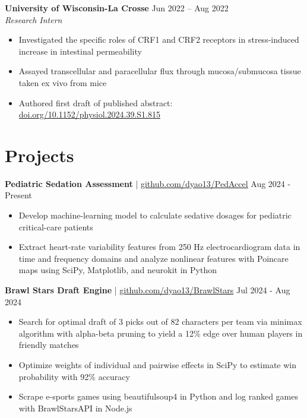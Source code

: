 \documentclass[11pt]{article}       %
\begin{document}
\textbf{University of Wisconsin-La Crosse} \hfill Jun 2022 – Aug 2022 \\
\textit{Research Intern} \vspace{-9pt} \\
\begin{itemize}
  \item Investigated the specific roles of CRF1 and CRF2 receptors in stress-induced increase in intestinal permeability
  \item Assayed transcellular and paracellular flux through mucosa/submucosa tissue taken ex vivo from mice
  \item Authored first draft of published abstract: \href{https://doi.org/10.1152/physiol.2024.39.S1.815}{doi.org/10.1152/physiol.2024.39.S1.815}
\end{itemize}

\vspace{-18.5pt}

\section*{Projects}
\textbf{Pediatric Sedation Assessment} | \href{https://github.com/dyao13/PedAccel}{github.com/dyao13/PedAccel} \hfill Aug 2024 - Present \vspace{-9pt} \\
\begin{itemize}
  \item Develop machine-learning model to calculate sedative dosages for pediatric critical-care patients
  \item Extract heart-rate variability features from 250 Hz electrocardiogram data in time and frequency domains and analyze nonlinear features with Poincare maps using SciPy, Matplotlib, and neurokit in Python
\end{itemize}

\textbf{Brawl Stars Draft Engine} | \href{https://github.com/dyao13/BrawlStars}{github.com/dyao13/BrawlStars} \hfill Jul 2024 - Aug 2024 \vspace{-9pt} \\
\begin{itemize}
  \item Search for optimal draft of 3 picks out of 82 characters per team via minimax algorithm with alpha-beta pruning to yield a 12\% edge over human players in friendly matches
  \item Optimize weights of individual and pairwise effects in SciPy to estimate win probability with 92\% accuracy
  \item Scrape e-sports games using beautifulsoup4 in Python and log ranked games with BrawlStarsAPI in Node.js
\end{itemize}
\end{document}

